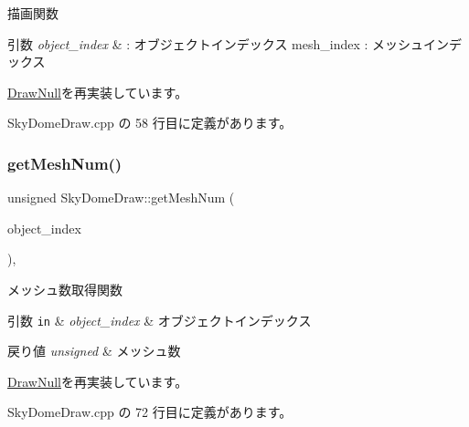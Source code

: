 描画関数 


\begin{DoxyParams}{引数}
{\em object\+\_\+index} & \+: オブジェクトインデックス mesh\+\_\+index \+: メッシュインデックス \\
\hline
\end{DoxyParams}


\mbox{\hyperlink{class_draw_null_a72ac0b7dc40b1469582419dcc5b0e114}{Draw\+Null}}を再実装しています。



 Sky\+Dome\+Draw.\+cpp の 58 行目に定義があります。

\mbox{\label{class_sky_dome_draw_a6b281bafa71c058ee83c373ad978e3bb}} 
\subsubsection{\texorpdfstring{get\+Mesh\+Num()}{getMeshNum()}}
{\footnotesize\ttfamily unsigned Sky\+Dome\+Draw\+::get\+Mesh\+Num (\begin{DoxyParamCaption}\item[{unsigned}]{object\+\_\+index }\end{DoxyParamCaption})\hspace{0.3cm}{\ttfamily [override]}, {\ttfamily [virtual]}}



メッシュ数取得関数 


\begin{DoxyParams}[1]{引数}
\mbox{\tt in}  & {\em object\+\_\+index} & オブジェクトインデックス \\
\hline
\end{DoxyParams}

\begin{DoxyRetVals}{戻り値}
{\em unsigned} & メッシュ数 \\
\hline
\end{DoxyRetVals}


\mbox{\hyperlink{class_draw_null_a4c566a37d27fac3dcf76c7970443f375}{Draw\+Null}}を再実装しています。



 Sky\+Dome\+Draw.\+cpp の 72 行目に定義があります。

\mbox{\label{class_sky_dome_draw_a99ec8e0a5aea708b66cf07c79a6449d1}} 
